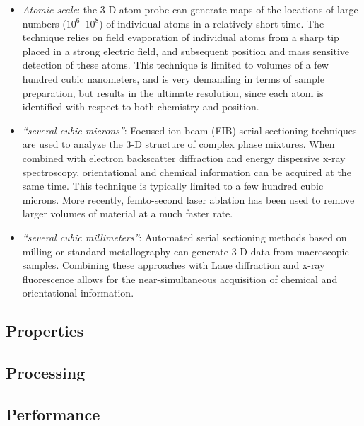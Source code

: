 \begin{itemize}
\item \textit{Atomic scale}:  the  3-D  atom probe \cite{seidman2000a,miller2004a,hono2005a} can generate maps of the locations of large numbers ($10^6$--$10^8$) of individual atoms in a relatively short time. The technique relies on field evaporation of individual atoms from a sharp tip placed in a strong electric field, and subsequent position and mass sensitive detection of these atoms.  This technique is limited to volumes of a few hundred cubic nanometers, and is very demanding in terms of sample preparation, but results in the ultimate resolution, since each atom is identified with respect to both chemistry and position.

\item \textit{``several cubic microns''}:  Focused ion beam (FIB) serial sectioning techniques \cite{dunn1999a,uchic2006a} are used to analyze the  3-D  structure of complex phase mixtures.  When combined with electron backscatter diffraction and energy dispersive x-ray spectroscopy, orientational and chemical information can be acquired at the same time.  This technique is typically limited  to a few hundred cubic microns.  More recently, femto-second laser ablation \cite{Echlin2015} has been used to remove larger volumes of material at a much faster rate.

\item \textit{``several cubic millimeters''}: Automated serial sectioning methods based on milling \cite{alkemper2001a} or standard metallography \cite{spowart2003a} can generate  3-D  data from macroscopic samples. Combining these approaches  with Laue diffraction and x-ray fluorescence allows for the near-simultaneous acquisition of chemical and orientational information.
\end{itemize}

\subsection{Properties\label{ssec:properties}}


\subsection{Processing\label{ssec:processing}}


\subsection{Performance\label{ssec:performance}}



